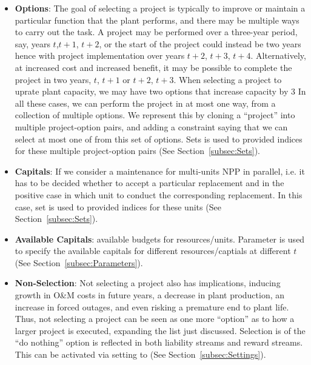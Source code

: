 \begin{itemize}
  \item \textbf{Options}: The goal of selecting a project is typically to improve or maintain
  a particular function that the plant performs, and there may be multiple ways to carry out
  the task. A project may be performed over a three-year period, say, years $t$,$t+1$, $t+2$, or the
  start of the project could instead be two years hence with project implementation over
  years $t+2$, $t+3$, $t+4$. Alternatively, at increased cost and increased benefit, it may be
  possible to complete the project in two years, $t$, $t+1$ or $t+2$, $t+3$. When selecting a project
  to uprate plant capacity, we may have two options that increase capacity by 3%
  In all these cases, we can perform the project in at most one way, from a collection of
  multiple options. We represent this by cloning a “project” into multiple project-option pairs,
  and adding a constraint saying that we can select at most one of from this set of options.
  Sets  is used to provided indices for these multiple project-option pairs
  (See Section~\ref{subsec:Sets}).

  \item \textbf{Capitals}: If we consider a maintenance for multi-units NPP in parallel,
  i.e. it has to be decided whether to accept a particular replacement and in the positive
  case in which unit to conduct the corresponding replacement. In this case, set 
  is used to provided indices for these units (See Section~\ref{subsec:Sets}).

  \item \textbf{Available Capitals}: available budgets for resources/units. Parameter
   is used to specify the available capitals for different
  resources/captials at different $t$ (See Section~\ref{subsec:Parameters}).

  \item \textbf{Non-Selection}: Not selecting a project also has implications, inducing growth
  in O\&M costs in future years, a decrease in plant production, an increase in forced outages,
  and even risking a premature end to plant life. Thus, not selecting a project can be seen as
  one more “option” as to how a larger project is executed, expanding the list just discussed.
  Selection is of the “do nothing” option is reflected in both liability streams and reward
  streams. This can be activated via setting  to 
  (See Section~\ref{subsec:Settings}).


\end{itemize}
